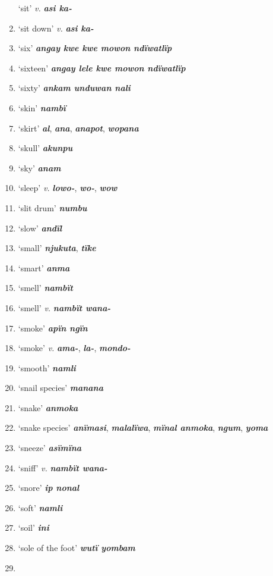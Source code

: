 \begin{enumerate}[noitemsep, label={}, align=left, widest=190, labelsep=1ex,leftmargin=*,itemindent=-10pt]
‘sit’ \textit{v.} \textbf{\textit{asi ka-}} \item
‘sit down’ \textit{v.} \textbf{\textit{asi ka-}} \item
‘six’ \textbf{\textit{angay kwe kwe mowon ndïwatlïp}} \item
‘sixteen’ \textbf{\textit{angay lele kwe mowon ndïwatlïp}} \item
‘sixty’ \textbf{\textit{ankam unduwan nali}} \item
‘skin’ \textbf{\textit{nambï}} \item
‘skirt’ \textbf{\textit{al}}, \textbf{\textit{ana}}, \textbf{\textit{anapot}}, \textbf{\textit{wopana}} \item
‘skull’ \textbf{\textit{akunpu}} \item
‘sky’ \textbf{\textit{anam}} \item
‘sleep’ \textit{v.} \textbf{\textit{lowo-}}, \textbf{\textit{wo-}}, \textbf{\textit{wow}} \item
‘slit drum’ \textbf{\textit{numbu}} \item
‘slow’ \textbf{\textit{andïl}} \item
‘small’ \textbf{\textit{njukuta}}, \textbf{\textit{tïke}} \item
‘smart’ \textbf{\textit{anma}} \item
‘smell’ \textbf{\textit{nambït}} \item
‘smell’ \textit{v.} \textbf{\textit{nambït wana-}} \item
‘smoke’ \textbf{\textit{apïn ngïn}} \item
‘smoke’ \textit{v.} \textbf{\textit{ama-}}, \textbf{\textit{la-}}, \textbf{\textit{mondo-}} \item
‘smooth’ \textbf{\textit{namli}} \item
‘snail species’ \textbf{\textit{manana}} \item
‘snake’ \textbf{\textit{anmoka}} \item
‘snake species’ \textbf{\textit{anïmasi}}, \textbf{\textit{malalïwa}}, \textbf{\textit{mïnal anmoka}}, \textbf{\textit{ngum}}, \textbf{\textit{yoma}} \item
‘sneeze’ \textbf{\textit{asïmïna}} \item
‘sniff’ \textit{v.} \textbf{\textit{nambït wana-}} \item
‘snore’ \textbf{\textit{ip nonal}} \item
‘soft’ \textbf{\textit{namli}} \item
‘soil’ \textbf{\textit{ini}} \item
‘sole of the foot’ \textbf{\textit{wutï yombam}} \item

\end{enumerate}
